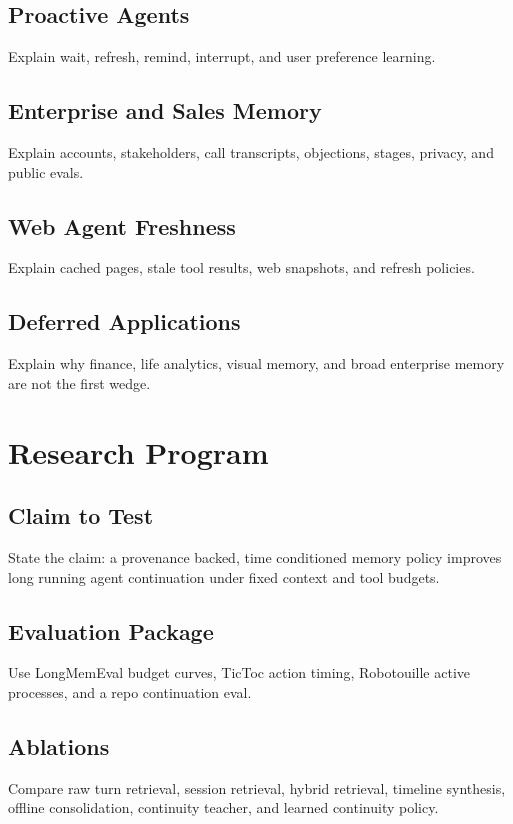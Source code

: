 \documentclass[11pt]{article}
\begin{document}
\subsection{Proactive Agents}
Explain wait, refresh, remind, interrupt, and user preference learning.

\subsection{Enterprise and Sales Memory}
Explain accounts, stakeholders, call transcripts, objections, stages, privacy, and public evals.

\subsection{Web Agent Freshness}
Explain cached pages, stale tool results, web snapshots, and refresh policies.

\subsection{Deferred Applications}
Explain why finance, life analytics, visual memory, and broad enterprise memory are not the first wedge.

\section{Research Program}

\subsection{Claim to Test}
State the claim: a provenance backed, time conditioned memory policy improves long running agent continuation under fixed context and tool budgets.

\subsection{Evaluation Package}
Use LongMemEval budget curves, TicToc action timing, Robotouille active processes, and a repo continuation eval.

\subsection{Ablations}
Compare raw turn retrieval, session retrieval, hybrid retrieval, timeline synthesis, offline consolidation, continuity teacher, and learned continuity policy.
\end{document}
